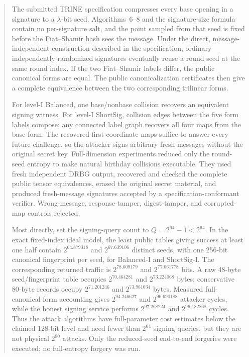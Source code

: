 \documentclass[11pt,a4paper]{article}
\begin{document}
\begin{abstract}
The submitted TRINE specification compresses every base opening in a signature
to a $\lambda$-bit seed.  Algorithms~6--8 and the signature-size formula contain
no per-signature salt, and the point sampled from that seed is fixed before the
Fiat--Shamir hash sees the message.  Under the direct, message-independent
construction described in the specification, ordinary independently randomized
signatures eventually reuse a round seed at the same round index.  If the two
Fiat--Shamir labels differ, the public canonical forms are equal.  The public
canonicalization certificates then give a complete equivalence between the two
corresponding trilinear forms.

For level-I Balanced, one base/nonbase collision recovers an equivalent signing
witness.  For level-I ShortSig, collision edges between the five form labels
compose; any connected label graph recovers all four maps from the base form.
The recovered first-coordinate maps suffice to answer every future challenge,
so the attacker signs arbitrary fresh messages without the original secret key.
Full-dimension experiments reduced only the round-seed entropy to make natural
birthday collisions executable.  They used fresh independent DRBG output,
recovered and checked the complete public tensor equivalences, erased the
original secret material, and produced fresh-message signatures accepted by a
specification-conformant verifier.  Wrong-message, response-tamper,
digest-tamper, and corrupted-map controls rejected.

Most directly, set the signing-query count to
$Q=2^{64}-1<2^{64}$.  In the exact fixed-index ideal model, the least public
tables giving success at least one half contain $2^{64.879318}$ and
$2^{67.639106}$ distinct seeds, with one 256-bit canonical fingerprint per
seed, for Balanced-I and ShortSig-I.  The corresponding returned traffic is
$2^{78.609179}$ and $2^{77.661778}$ bits.  A raw 48-byte seed/fingerprint
table occupies $2^{70.464281}$ and $2^{73.224068}$ bytes; conservative 80-byte
records occupy $2^{71.201246}$ and $2^{73.961034}$ bytes.  Measured
full-canonical-form accounting gives $2^{94.246627}$ and $2^{96.990188}$
attacker cycles, while the honest signing service performs $2^{97.268224}$
and $2^{96.182868}$ cycles.  Thus the attack algorithms have full-parameter
cost estimates below the claimed 128-bit level and need fewer than $2^{64}$
signing queries, but they are not physical $2^{80}$ attacks.  Only the
reduced-seed end-to-end forgeries were executed; no full-entropy forgery was
run.


\end{abstract}
\end{document}
